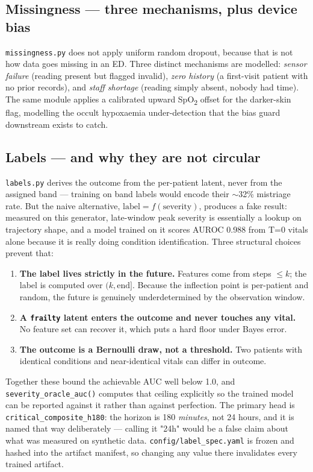 \documentclass[10pt,a4paper,twocolumn]{article}
\newcommand{\pth}[1]{\textcolor{SecPurple}{\texttt{#1}}}
\newcommand{\cm}[1]{\texttt{#1}}
\begin{document}
\subsection{Missingness --- three mechanisms, plus device bias}
\pth{missingness.py} does not apply uniform random dropout, because that is not how data goes
missing in an ED. Three distinct mechanisms are modelled: \emph{sensor failure} (reading present
but flagged invalid), \emph{zero history} (a first-visit patient with no prior records), and
\emph{staff shortage} (reading simply absent, nobody had time). The same module applies a
calibrated upward SpO\textsubscript{2} offset for the darker-skin flag, modelling the occult
hypoxaemia under-detection that the bias guard downstream exists to catch.

\subsection{Labels --- and why they are not circular}
\pth{labels.py} derives the outcome from the per-patient latent, never from the assigned band ---
training on band labels would encode their $\sim$32\% mistriage rate. But the naive alternative,
$\text{label} = f(\text{severity})$, produces a fake result: measured on this generator,
late-window peak severity is essentially a lookup on trajectory shape, and a model trained on it
scores AUROC 0.988 from T=0 vitals alone because it is really doing condition identification.
Three structural choices prevent that:

\begin{enumerate}
  \item \textbf{The label lives strictly in the future.} Features come from steps $\le k$; the
        label is computed over $(k, \text{end}]$. Because the inflection point is per-patient and
        random, the future is genuinely underdetermined by the observation window.
  \item \textbf{A \cm{frailty} latent enters the outcome and never touches any vital.} No feature
        set can recover it, which puts a hard floor under Bayes error.
  \item \textbf{The outcome is a Bernoulli draw, not a threshold.} Two patients with identical
        conditions and near-identical vitals can differ in outcome.
\end{enumerate}

\noindent Together these bound the achievable AUC well below 1.0, and
\cm{severity\_oracle\_auc()} computes that ceiling explicitly so the trained model can be reported
against it rather than against perfection. The primary head is
\cm{critical\_composite\_h180}: the horizon is 180 \emph{minutes}, not 24 hours, and it is named
that way deliberately --- calling it "24h" would be a false claim about what was measured on
synthetic data. \pth{config/label\_spec.yaml} is frozen and hashed into the artifact manifest, so
changing any value there invalidates every trained artifact.
\end{document}
